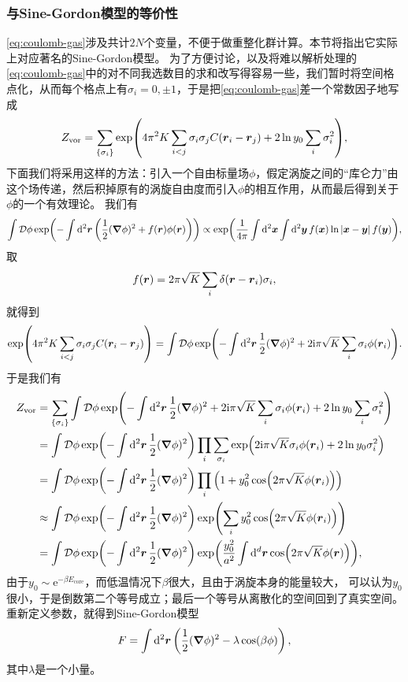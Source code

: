 \documentclass[hyperref, UTF8, a4paper]{ctexart}
\newcommand*{\ii}{\mathrm{i}}
\newcommand*{\ee}{\mathrm{e}}
\newcommand*{\fd}[1]{\mathcal{D} #1}
\begin{document}
\subsubsection{与Sine-Gordon模型的等价性}


\eqref{eq:coulomb-gas}涉及共计$2N$个变量，不便于做重整化群计算。本节将指出它实际上对应著名的Sine-Gordon模型。
为了方便讨论，以及将难以解析处理的\eqref{eq:coulomb-gas}中的对不同我选数目的求和改写得容易一些，我们暂时将空间格点化，从而每个格点上有$\sigma_i = 0, \pm 1$，于是把\eqref{eq:coulomb-gas}差一个常数因子地写成
\[
    Z_\text{vor} = \sum_{\{\sigma_i\}} \exp(4 \pi^2 K \sum_{i < j} \sigma_i \sigma_j C(\vb*{r}_i - \vb*{r}_j) + 2 \ln y_0 \sum_i \sigma_i^2),
\]
下面我们将采用这样的方法：引入一个自由标量场$\phi$，假定涡旋之间的“库仑力”由这个场传递，然后积掉原有的涡旋自由度而引入$\phi$的相互作用，从而最后得到关于$\phi$的一个有效理论。
我们有
\[
    \int \fd{\phi} \exp(- \int \dd[2]{\vb*{r}} \left( \frac{1}{2} (\grad{\phi})^2 + f(\vb*{r}) \phi(\vb*{r}) \right) ) \propto \exp(\frac{1}{4\pi} \int \dd[2]{\vb*{x}} \int \dd[2]{\vb*{y}} f(\vb*{x}) \ln \abs*{\vb*{x} - \vb*{y}} f(\vb*{y})),
\]
取
\[
    f(\vb*{r}) = 2 \pi \sqrt{K} \sum_i \delta(\vb*{r} - \vb*{r}_i) \sigma_i,
\]
就得到
\[
    \exp(4 \pi^2 K \sum_{i < j} \sigma_i \sigma_j C(\vb*{r}_i - \vb*{r}_j)) = \int \fd{\phi} \exp(- \int \dd[2]{\vb*{r}} \frac{1}{2} (\grad{\phi})^2 + 2\ii \pi \sqrt{K} \sum_i \sigma_i \phi(\vb*{r}_i) ).
\]
于是我们有
\[
    \begin{aligned}
        Z_\text{vor} &= \sum_{\{\sigma_i\}} \int \fd{\phi} \exp(- \int \dd[2]{\vb*{r}} \frac{1}{2} (\grad{\phi})^2 + 2\ii \pi \sqrt{K} \sum_i \sigma_i \phi(\vb*{r}_i) + 2 \ln y_0 \sum_i \sigma_i^2) \\
        &= \int \fd{\phi} \exp(- \int \dd[2]{\vb*{r}} \frac{1}{2} (\grad{\phi})^2) \prod_i \sum_{\sigma_i} \exp( 2\ii \pi \sqrt{K} \sigma_i \phi(\vb*{r}_i) + 2 \ln y_0  \sigma_i^2) \\
        &= \int \fd{\phi} \exp(- \int \dd[2]{\vb*{r}} \frac{1}{2} (\grad{\phi})^2) \prod_i \left( 1 + y_0^2 \cos (2 \pi \sqrt{K} \phi(\vb*{r}_i)) \right) \\
        &\approx \int \fd{\phi} \exp(- \int \dd[2]{\vb*{r}} \frac{1}{2} (\grad{\phi})^2) \exp(\sum_i y_0^2 \cos(2\pi \sqrt{K} \phi(\vb*{r}_i) )) \\
        &= \int \fd{\phi} \exp(- \int \dd[2]{\vb*{r}} \frac{1}{2} (\grad{\phi})^2) \exp(\frac{y_0^2}{a^2} \int \dd[d]{\vb*{r}} \cos(2\pi \sqrt{K} \phi(\vb*{r}) )),
    \end{aligned}
\]
由于$y_0 \sim \ee^{- \beta E_\text{core}}$，而低温情况下$\beta$很大，且由于涡旋本身的能量较大， %
可以认为$y_0$很小，于是倒数第二个等号成立；最后一个等号从离散化的空间回到了真实空间。
重新定义参数，就得到Sine-Gordon模型
\begin{equation}
    F = \int \dd[2]{\vb*{r}} \left( \frac{1}{2} (\grad{\phi})^2 - \lambda \cos(\beta \phi) \right),
    \label{eq:sine-gordon}
\end{equation}
其中$\lambda$是一个小量。
\end{document}
